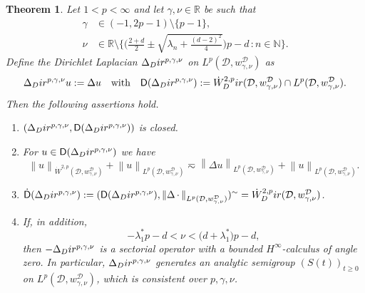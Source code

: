 \documentclass[10pt,a4paper]{amsart}
\newtheorem{theorem}{Theorem}
\newcommand{\Dir}{\textup{Dir}}
\newcommand{\N}{\ensuremath{\mathbb{N}}}
\newcommand{\R}{\ensuremath{\mathbb{R}}}
\newcommand{\calD}{\ensuremath{\mathcal{D}}}
\newcommand{\nrm}[1]{\left\lVert #1 \right\rVert}
\newcommand{\sfD}{\ensuremath{\mathsf{D}}}
\begin{document}
\begin{theorem}\label{thm:Laplace:inhom}
Let  $1<p<\infty$ and let $\gamma,\nu\in\R$ be such that
\begin{equation}\label{eq:range:gamma-nu}\begin{aligned}
     \gamma&\in (-1,2p-1)\setminus\{p-1\},\\ \nu&\in\R\setminus\Big\{\Big(\tfrac{2+d}{2}\pm\sqrt{\lambda_n+\tfrac{(d-2)^2}{4}}\Big)p-d\,\colon n\in\N  \Big\}.
\end{aligned}
\end{equation}
Define the Dirichlet Laplacian $\Delta_\Dir^{p,\gamma,\nu}$ on $L^p(\calD,w_{\gamma,\nu}^\calD)$ as 
\[\Delta_\Dir^{p,\gamma,\nu}u:=\Delta u \quad \text{with}\quad \sfD(\Delta_\Dir^{p,\gamma,\nu}):=\Dot W^{2,p}_\Dir(\calD,w_{\gamma,\nu}^\calD)\cap L^p(\calD,w_{\gamma,\nu}^\calD).   \]
Then the following assertions hold.
\begin{enumerate}[\textup{(\roman*)}]
\item\label{it:Laplace:inhom:closed} $(\Delta_\Dir^{p,\gamma,\nu},\sfD(\Delta_\Dir^{p,\gamma,\nu}))$ is closed.
\item\label{it:Laplace:inhom:equivnrms} 
For $u\in \sfD(\Delta_\Dir^{p,\gamma,\nu})$ we have 
\[
\nrm{u}_{\Dot{W}^{2,p}(\calD,w_{\gamma,\nu}^\calD)}
+
\nrm{u}_{L^p(\calD,w_{\gamma,\nu}^\calD)}
\eqsim
\nrm{\Delta u}_{L^p(\calD,w_{\gamma,\nu}^\calD)} + \nrm{u}_{L^p(\calD,w_{\gamma,\nu}^\calD)}.
\]
\item\label{it:Laplace:hom:domain}  $\Dot{\sfD}(\Delta_\Dir^{p,\gamma,\nu}) := (\sfD(\Delta_\Dir^{p,\gamma,\nu}),\nrm{\Delta\,\cdot\,}_{L^p(\calD,w_{\gamma,\nu}^\calD)})^\sim=\Dot{W}^{2,p}_\Dir(\calD,w_{\gamma,\nu}^\calD)$. 
\item\label{it:Laplace:inhom:calculus}  If, in addition,
\begin{equation}\label{eq:range:calc:nu}
-\lambda_1^*p-d<\nu<\big(d+\lambda_1^*\big)p-d,    
\end{equation}
then $-\Delta_\Dir^{p,\gamma,\nu}$ is a sectorial operator with a bounded $H^\infty$-calculus of angle zero.
 In particular, $\Delta_\Dir^{p,\gamma,\nu}$ generates an analytic semigroup $(S(t))_{t\geq 0}$ on $L^p(\calD,w_{\gamma,\nu}^\calD)$, which is consistent over $p,\gamma,\nu$.
\end{enumerate}
\end{theorem}
\end{document}
